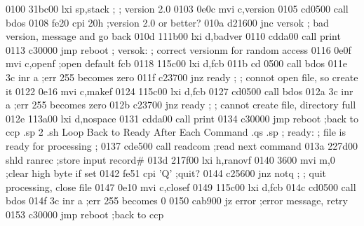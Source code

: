 0100 31bc00                       lxi    sp,stack
                         ;
                         ;        version 2.0
0103 0e0c                         mvi    c,version
0105 cd0500                       call   bdos
0108 fe20                         cpi    20h       ;version 2.0 or better?
010a d21600                       jnc    versok
                         ;        bad version, message and go back
010d 111b00                       lxi    d,badver
0110 cdda00                       call   print
0113 c30000                       jmp    reboot
                         ;
                         versok:
                         ;        correct versionm for random access
0116 0e0f                         mvi    c,openf   ;open default fcb
0118 115c00                       lxi    d,fcb
011b cd 0500                      call   bdos
011e 3c                           inr    a         ;err 255 becomes zero
011f c23700                       jnz    ready
                         ;
                         ;        connot open file, so create it
0122 0e16                         mvi    c,makef
0124 115c00                       lxi    d,fcb
0127 cd0500                       call   bdos
012a 3c                           inr    a         ;err 255 becomes zero
012b c23700                       jnz    ready
                         ;
                         ;        cannot create file, directory full
012e 113a00                       lxi    d,nospace
0131 cdda00                       call   print
0134 c30000                       jmp    reboot    ;back to ccp
.sp 2
.sh
                          Loop Back to Ready After Each Command
.qs
.sp
                         ;
                         ready:
                         ;        file is ready for processing
                         ;
0137 cde500                       call   readcom   ;read next command
013a 227d00                       shld   ranrec    ;store input record#
013d 217f00                       lxi    h,ranovf
0140 3600                         mvi    m,0       ;clear high byte if set
0142 fe51                         cpi    'Q'       ;quit?
0144 c25600                       jnz    notq
                         ;
                         ;        quit processing, close file
0147 0e10                         mvi    c,closef
0149 115c00                       lxi    d,fcb
014c cd0500                       call   bdos
014f 3c                           inr    a         ;err 255 becomes 0
0150 cab900                       jz     error     ;error message, retry
0153 c30000                       jmp    reboot    ;back to ccp
